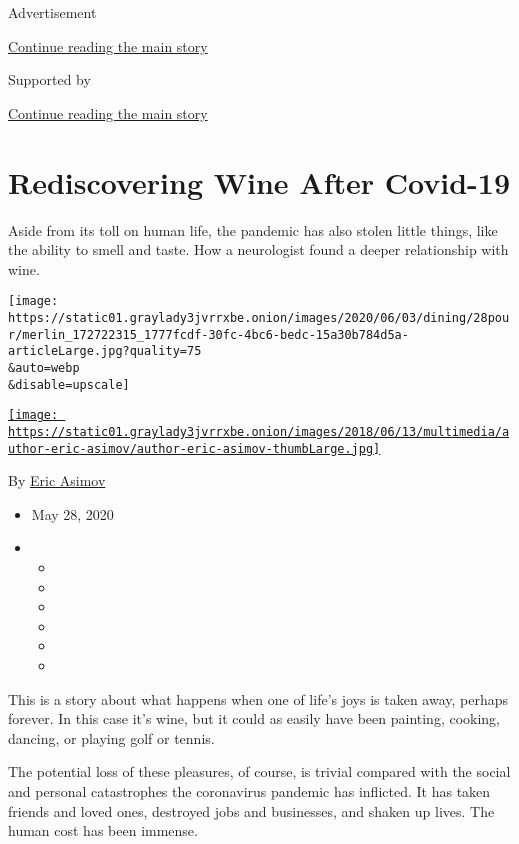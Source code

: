 Advertisement

\protect\hyperlink{after-top}{Continue reading the main story}

Supported by

\protect\hyperlink{after-sponsor}{Continue reading the main story}

\hypertarget{rediscovering-wine-after-covid-19}{%
\section{Rediscovering Wine After
Covid-19}\label{rediscovering-wine-after-covid-19}}

Aside from its toll on human life, the pandemic has also stolen little
things, like the ability to smell and taste. How a neurologist found a
deeper relationship with wine.

\texttt{[image: https://static01.graylady3jvrrxbe.onion/images/2020/06/03/dining/28pour/merlin\_172722315\_1777fcdf-30fc-4bc6-bedc-15a30b784d5a-articleLarge.jpg?quality=75\\\&auto=webp\\\&disable=upscale]}

\href{https://www.nytimes3xbfgragh.onion/by/eric-asimov}{\texttt{[image: https://static01.graylady3jvrrxbe.onion/images/2018/06/13/multimedia/author-eric-asimov/author-eric-asimov-thumbLarge.jpg]}}

By \href{https://www.nytimes3xbfgragh.onion/by/eric-asimov}{Eric Asimov}

\begin{itemize}
\item
  May 28, 2020
\item
  \begin{itemize}
  \item
  \item
  \item
  \item
  \item
  \item
  \end{itemize}
\end{itemize}

This is a story about what happens when one of life's joys is taken
away, perhaps forever. In this case it's wine, but it could as easily
have been painting, cooking, dancing, or playing golf or tennis.

The potential loss of these pleasures, of course, is trivial compared
with the social and personal catastrophes the coronavirus pandemic has
inflicted. It has taken friends and loved ones, destroyed jobs and
businesses, and shaken up lives. The human cost has been immense.

